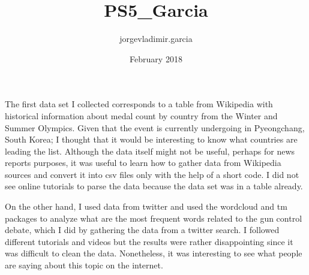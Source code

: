 \documentclass{article}
\title{PS5_Garcia}
\author{jorgevladimir.garcia }
\date{February 2018}
\begin{document}
The first data set I collected corresponds to a table from Wikipedia with historical information about medal count by country from the Winter and Summer Olympics. Given that the event is currently undergoing in Pyeongchang, South Korea; I thought that it would be interesting to know what countries are leading the list. Although the data itself might not be useful, perhaps for news reports purposes, it was useful to learn how to gather data from Wikipedia sources and convert it into csv files only with the help of a short code. I did not see online tutorials to parse the data because the data set was in a table already. 

On the other hand, I used data from twitter and used the wordcloud and tm packages to analyze what are the most frequent words related to the gun control debate, which I did by gathering the data from a twitter search. I followed different tutorials and videos but the results were rather disappointing since it was difficult to clean the data. Nonetheless, it was interesting to see what people are saying about this topic on the internet. 
\end{document}
